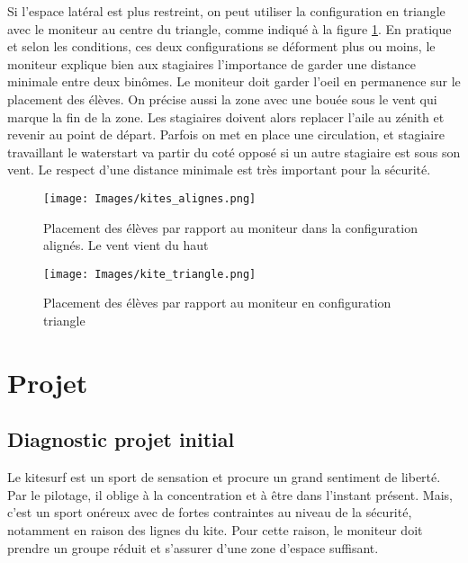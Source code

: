 \documentclass[11pt,a4paper]{report}
\begin{document}
Si l'espace latéral est plus restreint, on peut utiliser la configuration
en triangle avec le moniteur au centre du triangle, comme indiqué à la figure
\ref{kite_triangle}.
En pratique et selon les conditions, ces deux configurations se déforment plus ou moins, 
le moniteur explique bien aux stagiaires l'importance de garder une distance minimale 
entre deux binômes. Le moniteur doit garder l'oeil en permanence sur le
placement des élèves. On précise aussi la zone avec une bouée sous le vent qui marque
la fin de la zone. Les stagiaires doivent alors replacer l'aile au zénith et 
revenir au point de départ. Parfois on met en place une circulation, 
et stagiaire travaillant le waterstart va partir du coté opposé si 
un autre stagiaire est sous son  vent. Le respect d'une distance minimale est
très important pour la sécurité.


\begin{figure}
\begin{minipage}{0.4\textwidth}
\texttt{[image: Images/kites\_alignes.png]} 
\caption{Placement des élèves par rapport au moniteur dans la configuration
alignés\label{kites_alignes}. Le vent vient du haut}
\end{minipage}
\hfill
\begin{minipage}{0.4\textwidth}
\texttt{[image: Images/kite\_triangle.png]} 
\caption{Placement des élèves par rapport au moniteur en configuration
triangle\label{kite_triangle}}
\end{minipage}
\end{figure}






\FloatBarrier
\section{Projet}
\subsection{Diagnostic projet initial}

Le kitesurf est un sport de sensation et procure un grand
sentiment de liberté. Par le pilotage, il oblige à 
la concentration et à \^etre dans l'instant présent.
Mais, c'est un sport onéreux avec de fortes contraintes
au niveau de la sécurité, notamment en raison des lignes du kite.
Pour cette raison, le moniteur doit prendre un groupe réduit
et s'assurer d'une zone  d'espace suffisant. 
\end{document}
